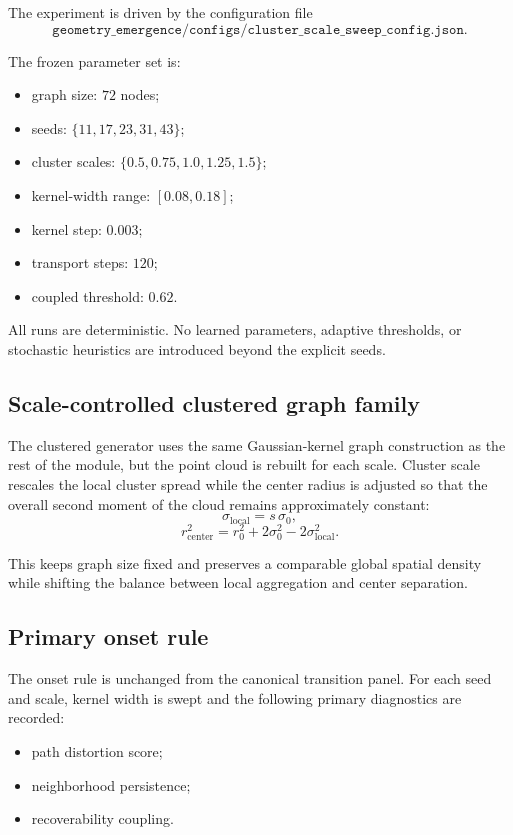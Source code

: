 \documentclass[11pt]{article}
\begin{document}
The experiment is driven by the configuration file
\[
\texttt{geometry\_emergence/configs/cluster\_scale\_sweep\_config.json}.
\]

The frozen parameter set is:
\begin{itemize}
\item graph size: $72$ nodes;
\item seeds: $\{11,17,23,31,43\}$;
\item cluster scales: $\{0.5,0.75,1.0,1.25,1.5\}$;
\item kernel-width range: $[0.08,0.18]$;
\item kernel step: $0.003$;
\item transport steps: $120$;
\item coupled threshold: $0.62$.
\end{itemize}

All runs are deterministic. No learned parameters, adaptive thresholds, or stochastic heuristics are introduced beyond the explicit seeds.

\subsection{Scale-controlled clustered graph family}

The clustered generator uses the same Gaussian-kernel graph construction as the rest of the module, but the point cloud is rebuilt for each scale. Cluster scale rescales the local cluster spread while the center radius is adjusted so that the overall second moment of the cloud remains approximately constant:
\[
\sigma_{\mathrm{local}} = s \, \sigma_0,
\]
\[
r_{\mathrm{center}}^2 = r_0^2 + 2\sigma_0^2 - 2\sigma_{\mathrm{local}}^2.
\]

This keeps graph size fixed and preserves a comparable global spatial density while shifting the balance between local aggregation and center separation.

\subsection{Primary onset rule}

The onset rule is unchanged from the canonical transition panel. For each seed and scale, kernel width is swept and the following primary diagnostics are recorded:
\begin{itemize}
\item path distortion score;
\item neighborhood persistence;
\item recoverability coupling.
\end{itemize}
\end{document}
